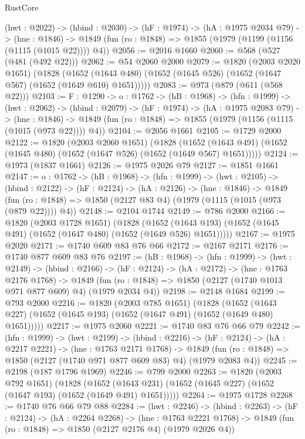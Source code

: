\begin{lexlean}{RustCore}
\begin{coremodule}
  (hwt : @2022) ->
  (hbind : @2030) ->
  (hF : @1974) ->
  (hA : @1975 @2034 @79) ->
  (hne : @1846) -> @1849 (fun (ro : @1848) => @1855 (@1979 (@1199 (@1156 (@1115 (@1015 @22)))) @4))
@2056 := @2016 @1660
@2060 := @568 (@527 (@481 (@492 @22)))
@2062 := @54 @2060 @2000
@2079 := @1820
    (@2003 @2020 @1651)
    (@1828
      (@1652 (@1643 @480) (@1652 (@1645 @526) (@1652 (@1647 @567) (@1652 (@1649 @610) @1651)))))
@2083 := @973 (@879 (@611 (@568 @22)))
@2103 := {F : @1290} ->
  {o : @1762} ->
  (hB : @1968) ->
  (hfn : @1999) ->
  (hwt : @2062) ->
  (hbind : @2079) ->
  (hF : @1974) ->
  (hA : @1975 @2083 @79) ->
  (hne : @1846) -> @1849 (fun (ro : @1848) => @1855 (@1979 (@1156 (@1115 (@1015 (@973 @22)))) @4))
@2104 := @2056 @1661
@2105 := @1729 @2000
@2122 := @1820
    (@2003 @2060 @1651)
    (@1828
      (@1652 (@1643 @491) (@1652 (@1645 @480) (@1652 (@1647 @526) (@1652 (@1649 @567) @1651)))))
@2124 := @1973 (@1837 @1661)
@2126 := @1975 @2026 @79
@2127 := @1851 @1661
@2147 := {o : @1762} ->
  (hB : @1968) ->
  (hfn : @1999) ->
  (hwt : @2105) ->
  (hbind : @2122) ->
  (hF : @2124) ->
  (hA : @2126) ->
  (hne : @1846) ->
  @1849 (fun (ro : @1848) => @1850 (@2127 @83 @4) (@1979 (@1115 (@1015 (@973 (@879 @22)))) @4))
@2148 := @2104 @1744
@2149 := @786 @2000
@2166 := @1820
    (@2003 @1728 @1651)
    (@1828
      (@1652 (@1643 @193) (@1652 (@1645 @491) (@1652 (@1647 @480) (@1652 (@1649 @526) @1651)))))
@2167 := @1975 @2020
@2171 := @1740 @609 @83 @76 @66
@2172 := @2167 @2171
@2176 := @1740 @877 @609 @83 @76
@2197 := (hB : @1968) ->
  (hfn : @1999) ->
  (hwt : @2149) ->
  (hbind : @2166) ->
  (hF : @2124) ->
  (hA : @2172) ->
  (hne : @1763 @2176 @1768) ->
  @1849 (fun (ro : @1848) => @1850 (@2127 (@1740 @1013 @971 @877 @609) @4) (@1979 @2034 @4))
@2198 := @2148 @1684
@2199 := @793 @2000
@2216 := @1820
    (@2003 @785 @1651)
    (@1828
      (@1652 (@1643 @227) (@1652 (@1645 @193) (@1652 (@1647 @491) (@1652 (@1649 @480) @1651)))))
@2217 := @1975 @2060
@2221 := @1740 @83 @76 @66 @79
@2242 := (hfn : @1999) ->
  (hwt : @2199) ->
  (hbind : @2216) ->
  (hF : @2124) ->
  (hA : @2217 @2221) ->
  (hne : @1763 @2171 @1768) ->
  @1849 (fun (ro : @1848) => @1850 (@2127 (@1740 @971 @877 @609 @83) @4) (@1979 @2083 @4))
@2245 := @2198 (@187 @1796 @1969)
@2246 := @799 @2000
@2263 := @1820
    (@2003 @792 @1651)
    (@1828
      (@1652 (@1643 @231) (@1652 (@1645 @227) (@1652 (@1647 @193) (@1652 (@1649 @491) @1651)))))
@2264 := @1975 @1728
@2268 := @1740 @76 @66 @79 @88
@2284 := (hwt : @2246) ->
  (hbind : @2263) ->
  (hF : @2124) ->
  (hA : @2264 @2268) ->
  (hne : @1763 @2221 @1768) -> @1849 (fun (ro : @1848) => @1850 (@2127 @2176 @4) (@1979 @2026 @4))

\end{coremodule}
\end{lexlean}
